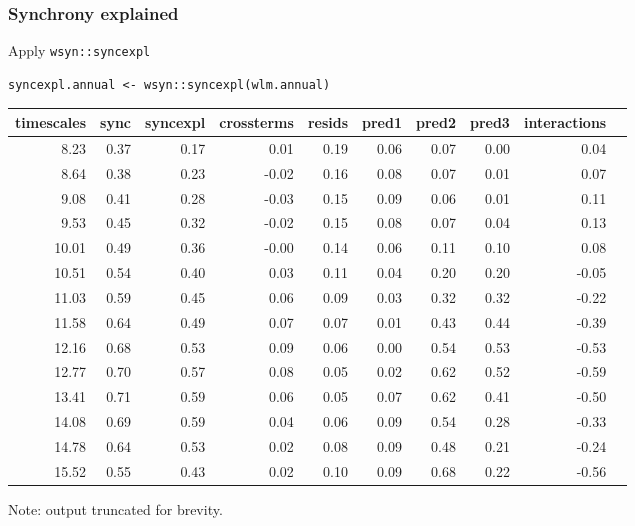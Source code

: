 \documentclass{beamer}
\begin{document}
\begin{frame}[fragile]
\frametitle{Synchrony explained}
\begin{exampleblock}{Apply \texttt{wsyn::syncexpl}}
\begin{verbatim}
syncexpl.annual <- wsyn::syncexpl(wlm.annual)
\end{verbatim}
\end{exampleblock}

\vspace{4pt}
\resizebox{10cm}{!}
{
\begin{tabular}{rrrrrrrrrr}
  \hline
 timescales & sync & syncexpl & crossterms & resids & pred1 & pred2 & pred3 & interactions\\ 
  \hline
  8.23 & 0.37 & 0.17 & 0.01 & 0.19 & 0.06 & 0.07 & 0.00 & 0.04 \\ 
  8.64 & 0.38 & 0.23 & -0.02 & 0.16 & 0.08 & 0.07 & 0.01 & 0.07 \\ 
  9.08 & 0.41 & 0.28 & -0.03 & 0.15 & 0.09 & 0.06 & 0.01 & 0.11 \\ 
  9.53 & 0.45 & 0.32 & -0.02 & 0.15 & 0.08 & 0.07 & 0.04 & 0.13 \\ 
  10.01 & 0.49 & 0.36 & -0.00 & 0.14 & 0.06 & 0.11 & 0.10 & 0.08 \\ 
  10.51 & 0.54 & 0.40 & 0.03 & 0.11 & 0.04 & 0.20 & 0.20 & -0.05 \\ 
  11.03 & 0.59 & 0.45 & 0.06 & 0.09 & 0.03 & 0.32 & 0.32 & -0.22 \\ 
  11.58 & 0.64 & 0.49 & 0.07 & 0.07 & 0.01 & 0.43 & 0.44 & -0.39 \\ 
  12.16 & 0.68 & 0.53 & 0.09 & 0.06 & 0.00 & 0.54 & 0.53 & -0.53 \\ 
  12.77 & 0.70 & 0.57 & 0.08 & 0.05 & 0.02 & 0.62 & 0.52 & -0.59 \\ 
  13.41 & 0.71 & 0.59 & 0.06 & 0.05 & 0.07 & 0.62 & 0.41 & -0.50 \\ 
  14.08 & 0.69 & 0.59 & 0.04 & 0.06 & 0.09 & 0.54 & 0.28 & -0.33 \\ 
  14.78 & 0.64 & 0.53 & 0.02 & 0.08 & 0.09 & 0.48 & 0.21 & -0.24 \\ 
  15.52 & 0.55 & 0.43 & 0.02 & 0.10 & 0.09 & 0.68 & 0.22 & -0.56 \\ 
   \hline
\end{tabular}
}
\vspace{1pt}
Note: output truncated for brevity.
\end{frame}
\end{document}
